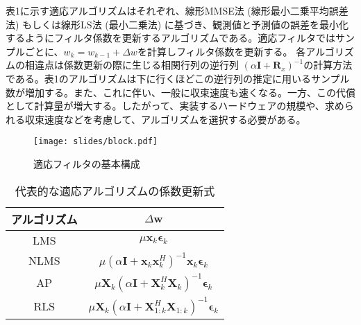 \documentclass[a4paper]{ltjsarticle}
\begin{document}





  表1に示す適応アルゴリズムはそれぞれ、線形MMSE法 (線形最小二乗平均誤差法) もしくは線形LS法 (最小二乗法) に基づき、観測値と予測値の誤差を最小化するようにフィルタ係数を更新するアルゴリズムである。適応フィルタではサンプルごとに、\(w_k = w_{k-1} + \Delta w\)を計算しフィルタ係数を更新する。 各アルゴリズムの相違点は係数更新の際に生じる相関行列の逆行列 \( \left(\alpha \symbf{I} + \symbf{R}_x\right) ^ {-1} \)の計算方法である。表1のアルゴリズムは下に行くほどこの逆行列の推定に用いるサンプル数が増加する。また、これに伴い、一般に収束速度も速くなる。一方、この代償として計算量が増大する。したがって、実装するハードウェアの規模や、求められる収束速度などを考慮して、アルゴリズムを選択する必要がある。

  \begin{figure}[h]
    \centering
    \texttt{[image: slides/block.pdf]} \\
    \caption{適応フィルタの基本構成}
    \label{fig:block}
  \end{figure}

  \begin{table}[h]
    \centering
    \caption{代表的な適応アルゴリズムの係数更新式}
    \label{tab:formula}
    \begin{tabular}{|c|c|}
    \hline
    アルゴリズム  & \(\Delta \symbf{w}\)                                                                                             \\ \hline
    LMS         & \( \mu \symbf{x}_k \symbf{\epsilon}_k \)                                                                         \\ \hline
    NLMS        & \( \mu \left( \alpha \symbf{I} + \symbf{x}_k \symbf{x}_k^H \right)^{-1} \symbf{x}_k \symbf{\epsilon}_k \)        \\ \hline
    AP          & \(\mu \symbf{X}_k \left( \alpha \symbf{I} + \symbf{X}_k^H \symbf{X}_k \right)^{-1} \symbf{\epsilon}_k\)          \\ \hline
    RLS         & \( \mu \symbf{X}_k \left( \alpha \symbf{I} + \symbf{X}_{1:k}^H \symbf{X}_{1:k} \right)^{-1} \symbf{\epsilon}_k\) \\ \hline
    \end{tabular}
  \end{table}
\end{document}
